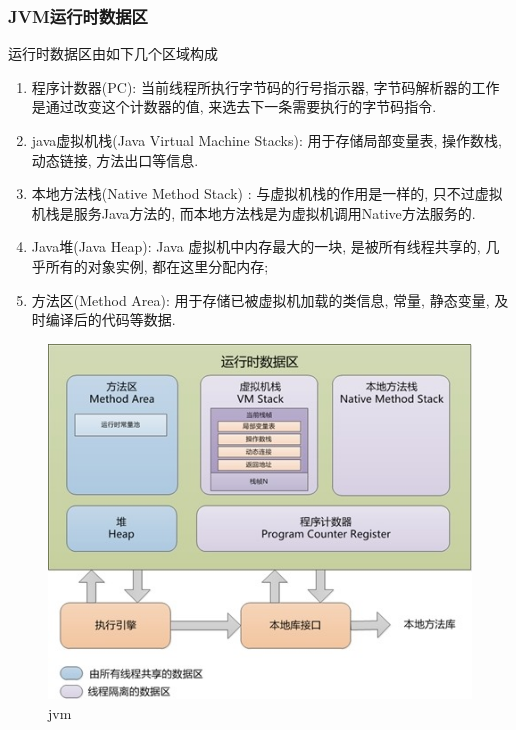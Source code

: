 \documentclass[UTF8]{ctexart}
\begin{document}
\subsubsection{JVM运行时数据区}
运行时数据区由如下几个区域构成
\begin{enumerate}
	\item 程序计数器(PC): 当前线程所执行字节码的行号指示器, 字节码解析器的工作是通过改变这个计数器的值, 来选去下一条需要执行的字节码指令.
	\item java虚拟机栈(Java Virtual Machine Stacks): 用于存储局部变量表, 操作数栈, 动态链接, 方法出口等信息.
	\item 本地方法栈(Native Method Stack) : 与虚拟机栈的作用是一样的, 只不过虚拟机栈是服务Java方法的, 而本地方法栈是为虚拟机调用Native方法服务的.
	\item Java堆(Java Heap): Java 虚拟机中内存最大的一块, 是被所有线程共享的, 几乎所有的对象实例, 都在这里分配内存;
	\item 方法区(Method Area): 用于存储已被虚拟机加载的类信息, 常量, 静态变量, 及时编译后的代码等数据.
\end{enumerate}
\begin{figure}
	\centering
	\includegraphics[width=0.7\linewidth]{figures/jvm.jpg}
	\caption{jvm}
	\label{fig:jvm}
\end{figure}
\end{document}
